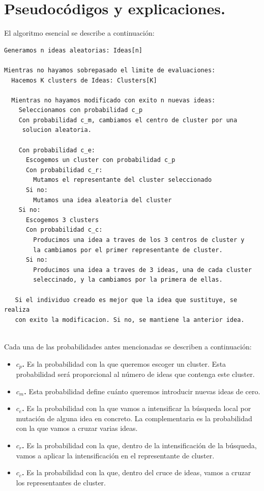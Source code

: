 \newpage

\section{Pseudocódigos y explicaciones.}
El algoritmo esencial se describe a continuación:\\

\noindent\hrulefill

\begin{lstlisting}
Generamos n ideas aleatorias: Ideas[n]

Mientras no hayamos sobrepasado el limite de evaluaciones:
  Hacemos K clusters de Ideas: Clusters[K]
  
  Mientras no hayamos modificado con exito n nuevas ideas:
    Seleccionamos con probabilidad c_p
    Con probabilidad c_m, cambiamos el centro de cluster por una 
     solucion aleatoria.
  
    Con probabilidad c_e:
      Escogemos un cluster con probabilidad c_p
      Con probabilidad c_r:
        Mutamos el representante del cluster seleccionado
      Si no:
        Mutamos una idea aleatoria del cluster
    Si no:
      Escogemos 3 clusters
      Con probabilidad c_c:
        Producimos una idea a traves de los 3 centros de cluster y 
        la cambiamos por el primer representante de cluster.
      Si no:
        Producimos una idea a traves de 3 ideas, una de cada cluster
        seleccinado, y la cambiamos por la primera de ellas.
        
   Si el individuo creado es mejor que la idea que sustituye, se realiza
   con exito la modificacion. Si no, se mantiene la anterior idea.
    
\end{lstlisting}

\noindent\hrulefill

Cada una de las probabilidades antes mencionadas se describen a continuación:\\

\begin{itemize}
	\item \textbf{$c_p$.} Es la probabilidad con la que queremos escoger un cluster. Esta probabilidad será proporcional al número de ideas que contenga este cluster.
	\item \textbf{$c_m$.} Esta probabilidad define cuánto queremos introducir nuevas ideas de cero.
	\item \textbf{$c_e$.} Es la probabilidad con la que vamos a intensificar la búsqueda local por mutación de alguna idea en concreto. La complementaria es la probabilidad con la que vamos a cruzar varias ideas.
	\item \textbf{$c_r$.} Es la probabilidad con la que, dentro de la intensificación de la búsqueda, vamos a aplicar la intensificación en el representante de cluster.
	\item \textbf{$c_c$.} Es la probabilidad con la que, dentro del cruce de ideas, vamos a cruzar los representantes de cluster.
\end{itemize}

